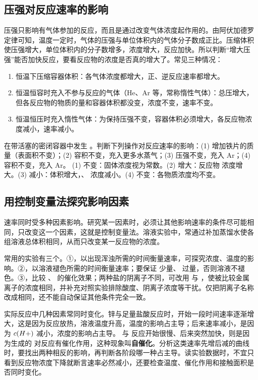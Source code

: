 \subsection{压强对反应速率的影响}
压强只影响有气体参加的反应，而且是通过改变气体浓度起作用的。由阿伏加德罗定律可知，温度一定时，气体的压强与单位体积内的气体分子数成正比。压缩体积使压强增大，单位体积内的分子数增多，浓度增大，反应加快。所以判断“增大压强”能否加快反应，要看反应物的浓度是否真的增大了。常见三种情况：
\begin{enumerate}
\item 恒温下压缩容器体积：各气体浓度都增大，正、逆反应速率都增大。
\item 恒温恒容时充入不参与反应的气体（He、Ar 等，常称惰性气体）：总压增大，但各反应物的物质的量和容器体积都没变，浓度不变，速率不变。
\item 恒温恒压时充入惰性气体：为保持压强不变，容器体积必须增大，各反应物浓度减小，速率减小。
\end{enumerate}

\begin{liti}[典型]
在带活塞的密闭容器中发生 。判断下列操作对反应速率的影响：(1) 增加铁片的质量（表面积不变）；(2) 容积不变，充入更多水蒸气；(3) 压强不变，充入 Ar；(4) 容积不变，充入 Ar。
\tcblower
\jie (1) 不变：固体浓度视为常数。(2) 增大：反应物  浓度增大。(3) 减小：体积增大，、 浓度减小。(4) 不变：各物质浓度均不变。
\end{liti}

\subsection{用控制变量法探究影响因素}
速率同时受多种因素影响。研究某一因素时，必须让其他影响速率的条件尽可能相同，只改变这一个因素，这就是控制变量法。溶液实验中，常通过补加蒸馏水使各组溶液总体积相同，从而只改变某一反应物的浓度。

常用的实验有三个。①，以出现浑浊所需的时间衡量速率，可探究浓度、温度的影响。②，以溶液褪色所需的时间衡量速率；要保证  少量、 过量，否则溶液不褪色。③，比较 、 的催化效果；两种盐的阴离子不同，可改用  与 ，使被比较金属离子的浓度相同，并补充对照实验排除酸度、阴离子浓度等干扰。仅把阴离子名称改成相同，还不能自动保证其他条件完全一致。

实际反应中几种因素常同时变化。锌与足量盐酸反应时，开始一段时间速率逐渐增大，这是因为反应放热，溶液温度升高，温度的影响占主导；后来速率减小，是因为 $c(H+)$ 减小，浓度的影响占主导。 与  反应开始很慢、后来突然加快，则是因为生成的  对反应有催化作用，这种现象叫\textbf{自催化}。分析这类速率先增后减的曲线时，要找出两种相反的影响，再判断各阶段哪一种占主导。读实验数据时，不宜只看到反应物浓度下降就断言速率必然减小，还要检查温度、催化作用和接触面积是否同时变化。

